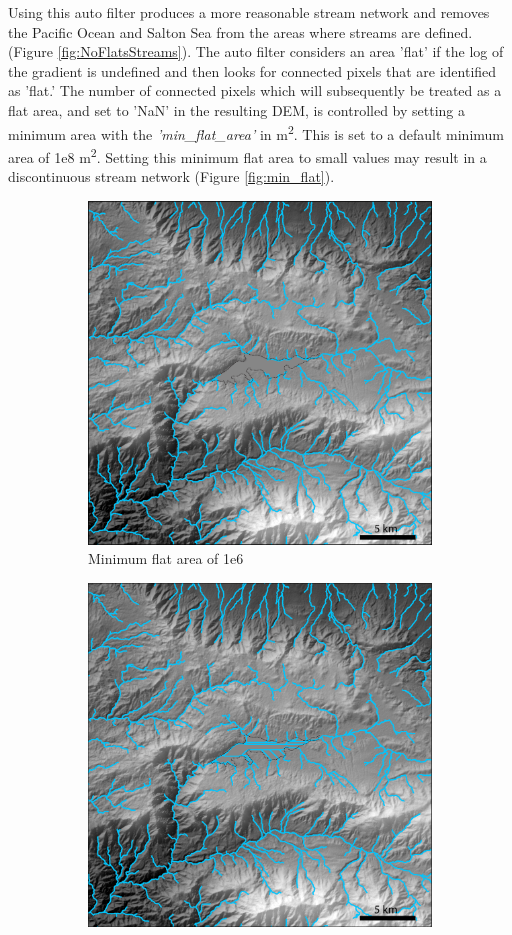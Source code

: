 \noindent
Using this auto filter produces a more reasonable stream network and removes the Pacific Ocean and Salton Sea from the areas where streams are defined. (Figure \ref{fig:NoFlatsStreams}). The auto filter considers an area 'flat' if the log of the gradient is undefined and then looks for connected pixels that are identified as 'flat.' The number of connected pixels which will subsequently be treated as a flat area, and set to 'NaN' in the resulting DEM, is controlled by setting a minimum area with the \textit{'min\_flat\_area'} in m\textsuperscript{2}. This is set to a default minimum area of 1e8 m\textsuperscript{2}. Setting this minimum flat area to small values may result in a discontinuous stream network (Figure \ref{fig:min_flat}).

\begin{figure}[H]
	\centering
	\begin{subfigure}{.40\textwidth}
		\centering
		\includegraphics[width=.8\linewidth]{PNGs/BigBear1e6.png}
		\caption{Minimum flat area of 1e6}
		\label{fig:mfsub1}
	\end{subfigure}%
	\begin{subfigure}{.40\textwidth}
		\centering
		\includegraphics[width=.8\linewidth]{PNGs/BigBear1e7.png}

\end{subfigure}
\end{figure}
